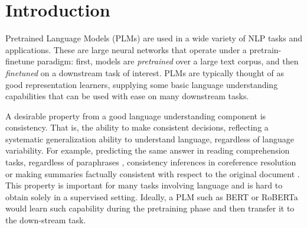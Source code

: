 \section{Introduction}
\label{sec:intro}

Pretrained Language Models (PLMs) are used in a wide variety of NLP tasks and applications. These are large neural networks that operate under a pretrain-finetune paradigm: first, models are \emph{pretrained} over a large text corpus, and then \emph{finetuned} on a downstream task of interest. PLMs are typically thought of as good representation learners, supplying some basic language understanding capabilities that can be used with ease on many downstream tasks.

A desirable property from a good language understanding component is consistency. That is, the ability to make consistent decisions, reflecting a systematic generalization ability to understand language, regardless of language variability. %
For example, predicting the same answer in reading comprehension tasks, regardless of paraphrases \cite{consistent-qa}, consistency inferences in coreference resolution \cite{denis2009global,chang2011inference} or making summaries factually consistent with respect to the original document \cite{kryscinski2020evaluating}.
This property is important for many tasks involving language and is hard to obtain solely in a supervised setting. 
Ideally, a PLM such as BERT or RoBERTa \cite{bert,roberta} would learn such capability during the pretraining phase and then transfer it to the down-stream task. %


